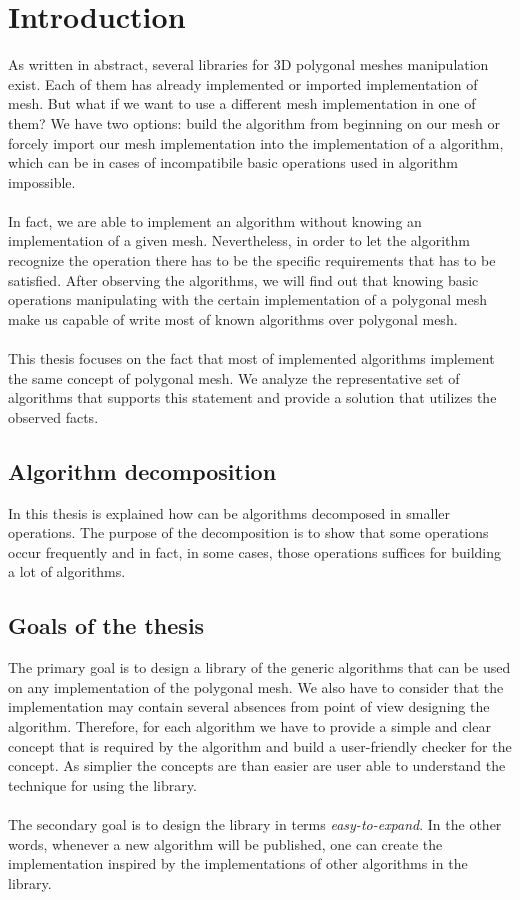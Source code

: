 \chapter*{Introduction}

As written in abstract, several libraries for 3D polygonal meshes manipulation exist.
Each of them has already implemented or imported implementation of mesh. But what if we want to use
a different mesh implementation in one of them? We have two options: build
the algorithm from beginning on our mesh or forcely import our mesh implementation into
the implementation of a algorithm, which can be in cases of incompatibile basic operations
used in algorithm impossible.\\
\\
In fact, we are able to implement an algorithm without knowing an implementation of
a given mesh. Nevertheless, in order to let the algorithm recognize the operation there
has to be the specific requirements that has to be satisfied.
After observing the algorithms, we will find out that
knowing basic operations manipulating with the certain implementation of a polygonal mesh
make us capable of write most of known algorithms over polygonal mesh.\\
\\
This thesis focuses on the fact that most of implemented algorithms implement the
same concept of polygonal mesh. We analyze the representative set of algorithms that
supports this statement and provide a solution that utilizes the observed facts.

\section{Algorithm decomposition}

In this thesis is explained how can be algorithms decomposed in smaller operations.
The purpose of the decomposition is to show that some operations occur frequently
and in fact, in some cases, those operations suffices for building a lot of algorithms.

\section{Goals of the thesis}

The primary goal is to design a library of the generic algorithms that can be used on any
implementation of the polygonal mesh. We also have to consider that the implementation
may contain several absences from point of view designing the algorithm. Therefore, for each
algorithm we have to provide a simple and clear concept that is required by the algorithm
and build a user-friendly checker for the concept. As simplier the concepts are than easier
are user able to understand the technique for using the library.\\
\\
The secondary goal is to design the library in terms \emph{easy-to-expand}. In the other words,
whenever a new algorithm will be published, one can create the implementation inspired
by the implementations of other algorithms in the library.

